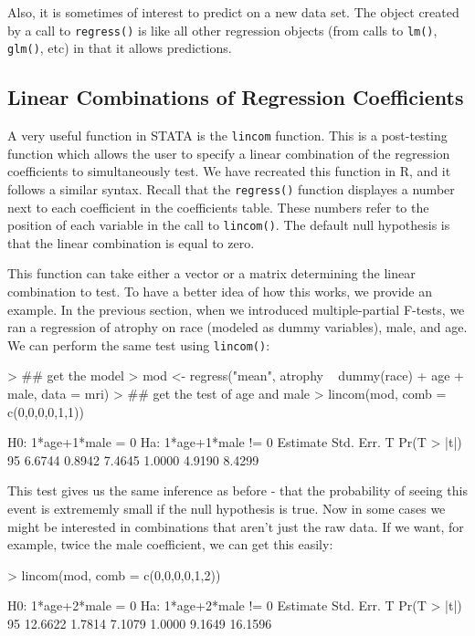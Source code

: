 \documentclass[landscape]{article}
\renewenvironment{Schunk}{\vspace{\topsep}}{\vspace{\topsep}}
\begin{document}
Also, it is sometimes of interest to predict on a new data set. The object created by a call to \texttt{regress()} is like all other regression objects (from calls to \texttt{lm()}, \texttt{glm()}, etc) in that it allows predictions.

\subsection{Linear Combinations of Regression Coefficients}
A very useful function in STATA is the \texttt{lincom} function. This is a post-testing function which allows the user to specify a linear combination of the regression coefficients to simultaneously test. We have recreated this function in R, and it follows a similar syntax. Recall that the \texttt{regress()} function displayes a number next to each coefficient in the coefficients table. These numbers refer to the position of each variable in the call to \texttt{lincom()}. The default null hypothesis is that the linear combination is equal to zero.

This function can take either a vector or a matrix determining the linear combination to test. To have a better idea of how this works, we provide an example. In the previous section, when we introduced multiple-partial F-tests, we ran a regression of atrophy on race (modeled as dummy variables), male, and age. We can perform the same test using \texttt{lincom()}:
\begin{Schunk}
\begin{Sinput}
> ## get the model
> mod <- regress("mean", atrophy ~ dummy(race) + age + male, data = mri)
> ## get the test of age and male
> lincom(mod, comb = c(0,0,0,0,1,1))
\end{Sinput}
\begin{Soutput}
H0: 1*age+1*male   =  0 
Ha: 1*age+1*male  !=  0 
   Estimate   Std. Err.           T Pr(T > |t|)        95%
     6.6744      0.8942      7.4645      1.0000      4.9190      8.4299 
\end{Soutput}
\end{Schunk}
This test gives us the same inference as before - that the probability of seeing this event is extrememly small if the null hypothesis is true. Now in some cases we might be interested in combinations that aren't just the raw data. If we want, for example, twice the male coefficient, we can get this easily:
\begin{Schunk}
\begin{Sinput}
> lincom(mod, comb = c(0,0,0,0,1,2))
\end{Sinput}
\begin{Soutput}
H0: 1*age+2*male   =  0 
Ha: 1*age+2*male  !=  0 
   Estimate   Std. Err.           T Pr(T > |t|)        95%
    12.6622      1.7814      7.1079      1.0000      9.1649     16.1596 
\end{Soutput}
\end{Schunk}
\end{document}
